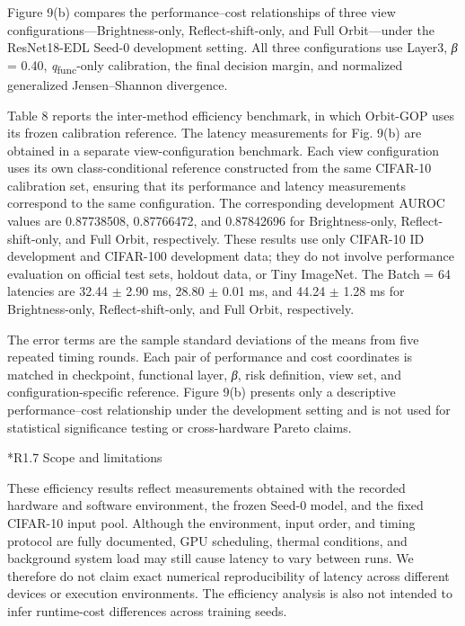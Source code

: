 \documentclass[11pt,a4paper]{article}
\makeatletter
\renewcommand\subsection{\@startsection{subsection}{2}{\z@}{-1.8ex plus -.5ex minus -.2ex}{.7ex plus .2ex}{\normalfont\normalsize\bfseries\raggedright}}
\makeatother
\begin{document}
Figure 9(b) compares the performance--cost relationships of three view configurations---Brightness-only, Reflect-shift-only, and Full Orbit---under the ResNet18-EDL Seed-0 development setting. All three configurations use Layer3, \emph{β} = 0.40, \emph{q}\textsubscript{func}-only calibration, the final decision margin, and normalized generalized Jensen--Shannon divergence.

Table 8 reports the inter-method efficiency benchmark, in which Orbit-GOP uses its frozen calibration reference. The latency measurements for Fig. 9(b) are obtained in a separate view-configuration benchmark. Each view configuration uses its own class-conditional reference constructed from the same CIFAR-10 calibration set, ensuring that its performance and latency measurements correspond to the same configuration. The corresponding development AUROC values are 0.87738508, 0.87766472, and 0.87842696 for Brightness-only, Reflect-shift-only, and Full Orbit, respectively. These results use only CIFAR-10 ID development and CIFAR-100 development data; they do not involve performance evaluation on official test sets, holdout data, or Tiny ImageNet. The Batch = 64 latencies are 32.44 $\pm$ 2.90 ms, 28.80 $\pm$ 0.01 ms, and 44.24 $\pm$ 1.28 ms for Brightness-only, Reflect-shift-only, and Full Orbit, respectively.

The error terms are the sample standard deviations of the means from five repeated timing rounds. Each pair of performance and cost coordinates is matched in checkpoint, functional layer, \emph{β}, risk definition, view set, and configuration-specific reference. Figure 9(b) presents only a descriptive performance--cost relationship under the development setting and is not used for statistical significance testing or cross-hardware Pareto claims.

\subsection*{R1.7 Scope and limitations}\label{s1.7-scope-and-limitations}

These efficiency results reflect measurements obtained with the recorded hardware and software environment, the frozen Seed-0 model, and the fixed CIFAR-10 input pool. Although the environment, input order, and timing protocol are fully documented, GPU scheduling, thermal conditions, and background system load may still cause latency to vary between runs. We therefore do not claim exact numerical reproducibility of latency across different devices or execution environments. The efficiency analysis is also not intended to infer runtime-cost differences across training seeds.
\end{document}
